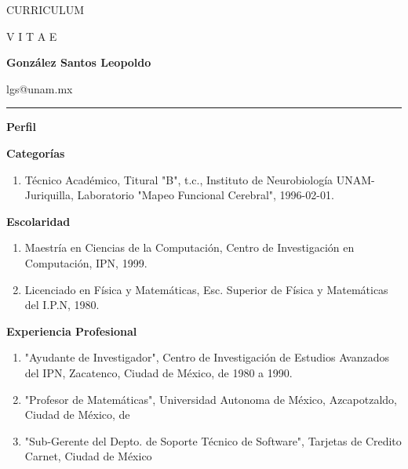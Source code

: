 \documentclass[12pt]{article}
\begin{document}
\centerline{{\LARGE CURRICULUM}}

\hfill

\centerline{{\LARGE V I T A E}}

\hfill

\centerline{\Large \textbf{González Santos Leopoldo}}

\centerline{{\footnotesize lgs@unam.mx}}

\rule{\textwidth}{1.0pt} 

\hfill


{\large \textbf{Perfil}}

\hfill

\textbf{Categorías}

\begin{enumerate}

\item Técnico Académico, Titural "B", t.c., Instituto de Neurobiología UNAM-Juriquilla, Laboratorio "Mapeo Funcional Cerebral", 1996-02-01.

\end{enumerate}

\textbf{Escolaridad}

\begin{enumerate}

\item Maestría en Ciencias de la Computación, Centro de Investigación en Computación, IPN, 1999.
\item Licenciado en Física y Matemáticas, Esc. Superior de Física y Matemáticas del I.P.N, 1980.

\end{enumerate}

\textbf{Experiencia Profesional}

\begin{enumerate}

\item "Ayudante de Investigador", Centro de Investigación de Estudios Avanzados del IPN, Zacatenco, Ciudad de México, de 1980 a 1990.

\item "Profesor de Matemáticas", Universidad Autonoma de México, Azcapotzaldo, Ciudad de México, de 

\item "Sub-Gerente del Depto. de Soporte Técnico de Software", Tarjetas de Credito Carnet, Ciudad de México

\end{enumerate}


\end{document}
